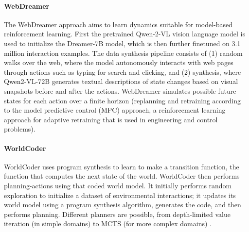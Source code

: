 \paragraph{WebDreamer} The WebDreamer approach aims to learn  dynamics suitable for model-based reinforcement learning. First the pretrained Qwen-2-VL vision language model \citep{wang2024qwen2} is used to initialize the Dreamer-7B model, which is then further finetuned on 3.1 million interaction examples.
The data synthesis pipeline consists of (1) random walks over the web,
where the model autonomously interacts with web pages through actions such as typing for search
and clicking, and (2) synthesis, where Qwen2-VL-72B  generates textual
descriptions of state changes based on visual snapshots before and after the actions. WebDreamer simulates possible
future states for each action over a finite horizon (replanning and retraining according to the model predictive control (MPC) approach, a reinforcement learning approach for adaptive retraining that is used in  engineering and control problems). 


\paragraph{WorldCoder}
WorldCoder uses program synthesis to learn to make a transition function, the function that computes the next state of the world. WorldCoder then performs planning-actions  using that coded world model. It initially
performs random exploration to initialize a dataset of environmental interactions; it updates its world
model using a program synthesis algorithm, generates the code, and then 
performs planning. Different planners are possible, from    depth-limited value iteration (in
simple domains) to MCTS (for more complex domains) \citep{browne2012survey}.


